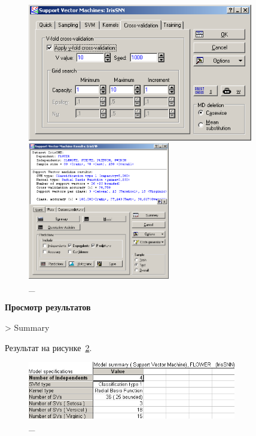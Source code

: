 \begin{figure}[!h]
  \centering

  \begin{minipage}{0.49\textwidth}
    \centering

    \includegraphics[height=6cm]
    {inc/ex_11.PNG}

    \caption{\_}

    \label{fig:11}
  \end{minipage}
  \begin{minipage}{0.49\textwidth}
    \centering

    \includegraphics[height=6cm]
    {inc/ex_12.PNG}

    \caption{\_}

    \label{fig:12}
  \end{minipage}
\end{figure}

\begin{center}
  \textbf{Просмотр результатов}
\end{center}

> Summary

Результат на рисунке~\ref{fig:13}.

\begin{figure}[!h]
  \centering

  \includegraphics[height=2.5cm]
  {inc/ex_13.PNG}

  \caption{\_}

  \label{fig:13}
\end{figure}

